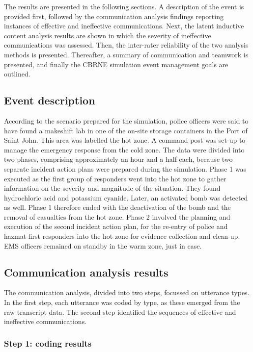 \documentclass[link]{IWCOMP}
\begin{document}
The results are presented in the following sections. A description of the
event is provided first, followed by the communication analysis findings
reporting instances of effective and ineffective communications. Next, the
latent inductive content analysis results are shown in which the severity of
ineffective communications was assessed. Then, the inter-rater reliability
of the two analysis methods is presented. Thereafter, a summary of
communication and teamwork is presented, and finally the CBRNE simulation
event management goals are outlined.

\subsection{Event description}\label{subsec4.1}

According to the scenario prepared for the simulation, police officers were
said to have found a makeshift lab in one of the on-site storage containers
in the Port of Saint John. This area was labelled the hot zone. A command
post was set-up to manage the emergency response from the cold zone. The
data were divided into two phases, comprising approximately an hour and a
half each, because two separate incident action plans were prepared during
the simulation. Phase 1 was executed as the first group of responders went
into the hot zone to gather information on the severity and magnitude of the
situation. They found hydrochloric acid and potassium cyanide. Later, an
activated bomb was detected as well. Phase 1 therefore ended with the
deactivation of the bomb and the removal of casualties from the hot zone.
Phase 2 involved the planning and execution of the second incident action
plan, for the re-entry of police and hazmat first responders into the hot
zone for evidence collection and clean-up. EMS officers remained on standby
in the warm zone, just in case.

\subsection{Communication analysis results}\label{subsec4.2}

The communication analysis, divided into two steps, focussed on utterance
types. In the first step, each utterance was coded by type, as these emerged
from the raw transcript data. The second step identified the sequences of
effective and ineffective communications.

\subsubsection{Step 1: coding results}\label{subsubsec4.2.1}
\end{document}
